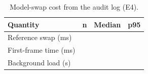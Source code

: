 \begin{table}[t]
\centering\small
\caption{Model-swap cost from the audit log (E4).}\label{tab:swap}
\begin{tabular}{lrrr}
\toprule
Quantity & n & Median & p95 \\
\midrule
Reference swap (ms) & \TBD{} & \TBD{} & \TBD{} \\
First-frame time (ms) & \TBD{} & \TBD{} & \TBD{} \\
Background load (s) & \TBD{} & \TBD{} & \TBD{} \\
\bottomrule
\end{tabular}
\end{table}

